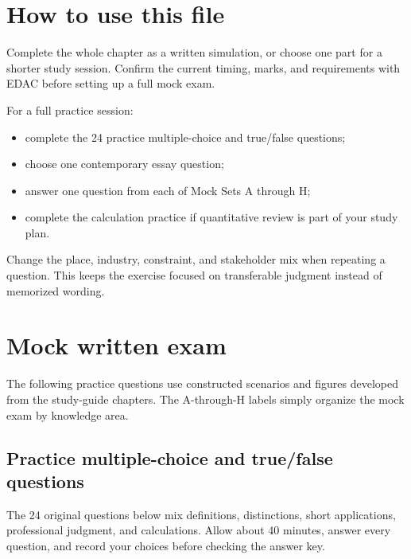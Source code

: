 \documentclass[11pt,letterpaper,oneside,openany]{book}
\newif\ifsectionhasicon
\newcommand{\currentsectionicon}{}
\newcommand{\marginsection}[2]{%
  \begingroup
  \sectionhasicontrue
  \def\currentsectionicon{#1}%
  \section[#2]{#2}%
  \endgroup
}
\begin{document}
\marginsection{route}{How to use this file}
Complete the whole chapter as a written simulation, or choose one part for a shorter study session. Confirm the current timing, marks, and requirements with EDAC before setting up a full mock exam.


For a full practice session:


\begin{itemize}
\item complete the 24 practice multiple-choice and true/false questions;
\item choose one contemporary essay question;
\item answer one question from each of Mock Sets A through H;
\item complete the calculation practice if quantitative review is part of your study plan.
\end{itemize}


Change the place, industry, constraint, and stakeholder mix when repeating a question. This keeps the exercise focused on transferable judgment instead of memorized wording.


\marginsection{clipboard-check}{Mock written exam}
The following practice questions use constructed scenarios and figures developed from the study-guide chapters. The A-through-H labels simply organize the mock exam by knowledge area.


\subsection[Practice multiple-choice and true/false questions]{Practice multiple-choice and true/false questions}
The 24 original questions below mix definitions, distinctions, short applications, professional judgment, and calculations. Allow about 40 minutes, answer every question, and record your choices before checking the answer key.
\end{document}

